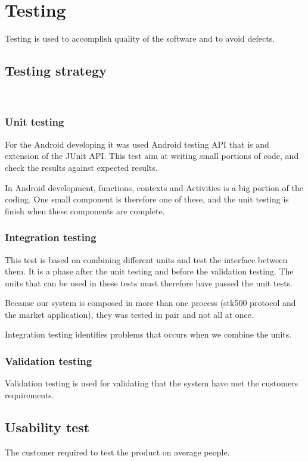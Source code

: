 \section{Testing}
	Testing is used to accomplish quality of the software and to avoid defects.
	
	\subsection{Testing strategy}
	\\
		\subsubsection{Unit testing}
			For the Android developing it was used Android testing API that is and extension of the JUnit API.
			This test aim at writing small portions of code, and check the results against expected results.

			In Android development, functions, contexts and Activities is a big portion of the coding.
			One small component is therefore one of these, and the unit testing is finish when these components are complete.

		\subsubsection{Integration testing}
			This test is based on combining different units and test the interface between them. It is a phase after the unit testing and before the validation testing. The units that can be used in these tests must therefore have passed the unit tests.

			Because our system is composed in more than one process (stk500 protocol and the market application), they 
			was tested in pair and not all at once.

			Integration testing identifies problems that occurs when we combine the units.

		\subsubsection{Validation testing}
			Validation testing is used for validating that the system have met the customers requirements.

	\subsection{Usability test}
		The customer required to test the product on average people.

